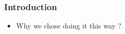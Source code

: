 \begin{frame}
\frametitle{Introduction}
\begin{itemize}
	
	\item 
	Why we chose doing it this way ?
	
\end{itemize}
\end{frame}

